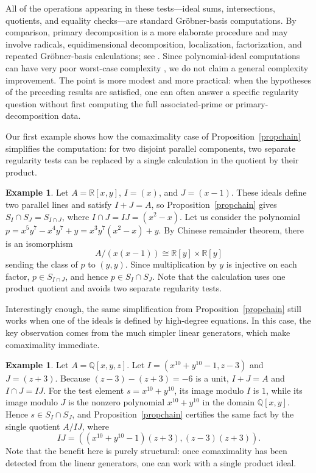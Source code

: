 \documentclass[11pt,leqno]{amsart}
\theoremstyle{definition}
\newtheorem{example}[theorem]{Example}
\numberwithin{equation}{section}
\begin{document}
All of the operations appearing in these tests---ideal sums, intersections, quotients, and equality checks---are standard Gr\"obner-basis computations. By comparison, primary decomposition is a more elaborate procedure and may involve radicals, equidimensional decomposition, localization, factorization, and repeated Gr\"obner-basis calculations; see \cite{GTZ88,EHV92,GP08}. Since polynomial-ideal computations can have very poor worst-case complexity \cite{MM82}, we do not claim a general complexity improvement. The point is more modest and more practical: when the hypotheses of the preceding results are satisfied, one can often answer a specific regularity question without first computing the full associated-prime or primary-decomposition data.

Our first example shows how the comaximality case of Proposition~\ref{propchain} simplifies the computation: for two disjoint parallel components, two separate regularity tests can be replaced by a single calculation in the quotient by their product.

\begin{example}
Let $A=\mathds{R}[x,y]$, $I=(x)$, and $J=(x-1)$. These ideals define two parallel lines and satisfy $I+J=A$, so Proposition~\ref{propchain} gives
$	S_I\cap S_J=S_{I\cap J}$, where $I\cap J=IJ=(x^2-x)$. Let us
consider the polynomial
$
p=x^5y^7-x^4y^7+y=x^3y^7(x^2-x)+y.
$
By Chinese remainder theorem,  there is an isomorphism
\[
A/(x(x-1))\cong\mathds{R}[y]\times\mathds{R}[y]
\]
sending the class of $p$ to $(y,y)$. Since multiplication by $y$ is injective on each factor, $p\in S_{I\cap J}$, and hence $p\in S_I\cap S_J$. Note that the calculation uses one product quotient and avoids two separate regularity tests.
\end{example}

Interestingly enough, the same simplification from Proposition~\ref{propchain} still works when one of the ideals is defined by high-degree equations. In this case, the key observation comes from the much simpler linear generators, which make comaximality immediate.

\begin{example}
Let $A=\mathds{Q}[x,y,z]$. Let
$
I=(x^{10}+y^{10}-1,z-3)$ and $J=(z+3).$
Because $(z-3)-(z+3)=-6$ is a unit, $I+J=A$ and $I\cap J=IJ$. For the test element $s=x^{10}+y^{10}$, its image modulo $I$ is $1$, while its image modulo $J$ is the nonzero polynomial $x^{10}+y^{10}$ in the domain $\mathds{Q}[x,y]$. Hence $s\in S_I\cap S_J$, and Proposition~\ref{propchain} certifies the same fact by the single quotient
$
A/IJ$, where
\[
IJ=((x^{10}+y^{10}-1)(z+3),(z-3)(z+3)).
\]
Note that the benefit here is purely structural: once comaximality has been detected from the linear generators, one can work with a single product ideal.
\end{example}
\end{document}
